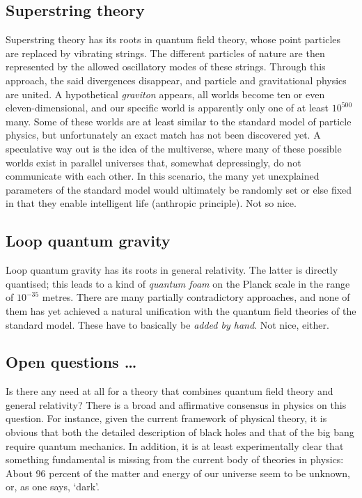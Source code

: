 \subsection*{Superstring theory}

Superstring theory has its roots in quantum field theory, whose point particles are replaced by vibrating strings. The different particles of nature are then represented by the allowed oscillatory modes of these strings. Through this approach, the said divergences disappear, and particle and gravitational physics are united. A hypothetical \emph{graviton} appears, all worlds become ten or even eleven-dimensional, and our specific world is apparently only one of at least $10^{500}$ many. Some of these worlds are at least similar to the standard model of particle physics, but unfortunately an exact match has not been discovered yet. A speculative way out is the idea of the multiverse, where many of these possible worlds exist in parallel universes that, somewhat depressingly, do not communicate with each other. In this scenario, the many yet unexplained parameters of the standard model would ultimately be randomly set or else fixed in that they enable intelligent life (anthropic principle). Not so nice.


\subsection*{Loop quantum gravity}

Loop quantum gravity has its roots in general relativity. The latter is directly quantised; this leads to a kind of \emph{quantum foam} on the Planck scale in the range of $10^{-35}$ metres. There are many partially contradictory approaches, and none of them has yet achieved a natural unification with the quantum field theories of the standard model. These have to basically be \emph{added by hand}. Not nice, either.


\subsection*{Open questions \dots}

Is there any need at all for a theory that combines quantum field theory and general relativity? There is a broad and affirmative consensus in physics on this question. For instance, given the current framework of physical theory, it is obvious that both the detailed description of black holes and that of the big bang require quantum mechanics. In addition, it is at least experimentally clear that something fundamental is missing from the current body of theories in physics: About 96 percent of the matter and energy of our universe seem to be unknown, or, as one says, \enquote*{dark}.
